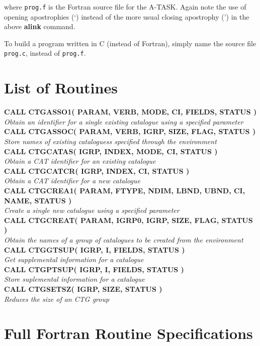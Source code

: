 \documentclass[twoside,11pt]{article}
\newenvironment{latexonly}{}{}
\renewcommand{\_}{\texttt{\symbol{95}}}
\newcommand{\noteroutine}[2]{{\small \bf #1} \\
                              \hspace*{3em} {\em #2} \\[1.5ex]}
\newcommand{\noteroutine}[2]{
      \begin{description}
         \item [{\bf {#1}}] {\em #2}
      \end{description}
   }
\newcommand{\latexonlysection}[1]{\section{#1}}
\newcommand{\latexonlysection}[1]{#1}
\begin{document}
where {\tt prog.f} is the Fortran source file for the A-TASK. Again
note the use of opening apostrophies (`) instead of the more usual
closing apostrophy (') in the above {\bf alink} command.

To build a program written in C (instead of Fortran), simply name the
source file {\tt prog.c}, instead of {\tt prog.f}.

\appendix

\begin{latexonly}
\latexonlysection{List of Routines}

\noteroutine{
      CALL CTG\_ASSO1( PARAM, VERB, MODE, CI, FIELDS, STATUS )
}{
   Obtain an identifier for a single existing catalogue using a specified
   parameter
}
\noteroutine{
      CALL CTG\_ASSOC( PARAM, VERB, IGRP, SIZE, FLAG, STATUS )
}{
   Store names of existing cataloguess specified through the environment
}
\noteroutine{
      CALL CTG\_CATAS( IGRP, INDEX, MODE, CI, STATUS )
}{
   Obtain a CAT identifier for an existing catalogue
}
\noteroutine{
      CALL CTG\_CATCR( IGRP, INDEX, CI, STATUS )
}{
   Obtain a CAT identifier for a new catalogue
}
\noteroutine{
      CALL CTG\_CREA1( PARAM, FTYPE, NDIM, LBND, UBND, CI, NAME,
                      STATUS )
}{
   Create a single new catalogue using a specified parameter
}
\noteroutine{
      CALL CTG\_CREAT( PARAM, IGRP0, IGRP, SIZE, FLAG, STATUS )
}{
   Obtain the names of a group of catalogues to be created from the
   environment
}
\noteroutine{
      CALL CTG\_GTSUP( IGRP, I, FIELDS, STATUS )
}{
   Get supplemental information for a catalogue
}
\noteroutine{
      CALL CTG\_PTSUP( IGRP, I, FIELDS, STATUS )
}{
   Store suplemental information for a catalogue
}
\noteroutine{
      CALL CTG\_SETSZ( IGRP, SIZE, STATUS )
}{
   Reduces the size of an CTG group
}

\end{latexonly}


\section{Full Fortran Routine Specifications}
\label {SEC:FULLSPEC}

\small
\end{document}
